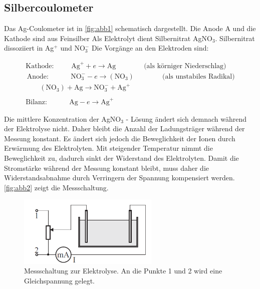 \documentclass[11pt,ngerman]{scrartcl}
\begin{document}
\subsection{Silbercoulometer}

Das Ag-Coulometer ist in \autoref{fig:abb1} schematisch dargestellt. Die Anode A und die Kathode sind
aus Feinsilber Als Elektrolyt dient Silbernitrat AgNO$_3$. Silbernitrat dissoziiert in Ag$^+$ und NO$_3^-$
Die Vorgänge an den Elektroden sind:\cite{vorlagesilber}

\begin{align*}
	\textrm{Kathode}: \,\, \qquad \textrm{Ag}^+ + e \longrightarrow \textrm{Ag} \qquad \qquad \textrm{(als körniger Niederschlag)}     \\
	\,\textrm{Anode}: \qquad \quad \textrm{NO}_3^- - e \longrightarrow (\textrm{NO}_3) \qquad \qquad \textrm{(als unstabiles Radikal)} \\
	\qquad(\textrm{NO}_3) + \textrm{Ag} \longrightarrow \textrm{NO}_3^- + \textrm{Ag}^+ \qquad \qquad \qquad \qquad \qquad \quad       \\
	\\
	\textrm{Bilanz}: \qquad \quad \textrm{Ag} - e \longrightarrow \textrm{Ag}^+  \qquad \qquad \qquad \qquad \qquad \qquad \qquad \qquad
\end{align*}

Die mittlere Konzentration der AgNO$_3$ - Lösung ändert sich demnach während der Elektrolyse
nicht. Daher bleibt die Anzahl der Ladungsträger während der Messung konstant. Es ändert sich
jedoch die Beweglichkeit der Ionen durch Erwärmung des Elektrolyten. Mit steigender Temperatur
nimmt die Beweglichkeit zu, dadurch sinkt der Widerstand des Elektrolyten. Damit die
Stromstärke während der Messung konstant bleibt, muss daher die Widerstandsabnahme durch
Verringern der Spannung kompensiert werden. \autoref{fig:abb2} zeigt die Messschaltung.

\begin{figure}[H]
	\begin{center}
		\includegraphics[width=0.6\textwidth]{abb2}
	\end{center}
	\caption{Messschaltung zur Elektrolyse. An die Punkte 1 und 2 wird eine Gleichspannung gelegt.}
	\label{fig:abb2}
\end{figure}
\end{document}
